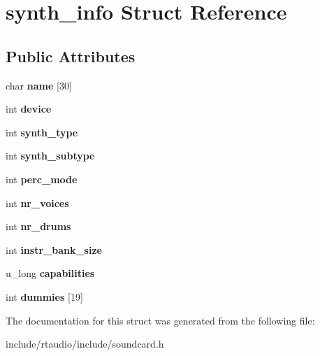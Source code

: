 \hypertarget{structsynth__info}{}\section{synth\+\_\+info Struct Reference}
\label{structsynth__info}
\subsection*{Public Attributes}
\begin{DoxyCompactItemize}
\item 
char {\bfseries name} \mbox{[}30\mbox{]}\hypertarget{structsynth__info_a39ea9232926050615deea90d1261eafb}{}\label{structsynth__info_a39ea9232926050615deea90d1261eafb}

\item 
int {\bfseries device}\hypertarget{structsynth__info_ad3cef2cac99f9234ed86ef7c159cf7b1}{}\label{structsynth__info_ad3cef2cac99f9234ed86ef7c159cf7b1}

\item 
int {\bfseries synth\+\_\+type}\hypertarget{structsynth__info_aab8a4f91e2b391aa530265dfe1cd9bd6}{}\label{structsynth__info_aab8a4f91e2b391aa530265dfe1cd9bd6}

\item 
int {\bfseries synth\+\_\+subtype}\hypertarget{structsynth__info_aa0452fb21cced9e9218d2a015ed1e556}{}\label{structsynth__info_aa0452fb21cced9e9218d2a015ed1e556}

\item 
int {\bfseries perc\+\_\+mode}\hypertarget{structsynth__info_ae24d12836748145fef1f52e832b338ce}{}\label{structsynth__info_ae24d12836748145fef1f52e832b338ce}

\item 
int {\bfseries nr\+\_\+voices}\hypertarget{structsynth__info_a0aee4d6a7231343d0b744a76d23e0eb7}{}\label{structsynth__info_a0aee4d6a7231343d0b744a76d23e0eb7}

\item 
int {\bfseries nr\+\_\+drums}\hypertarget{structsynth__info_a40907a0d95f12b3b66aae19108c36942}{}\label{structsynth__info_a40907a0d95f12b3b66aae19108c36942}

\item 
int {\bfseries instr\+\_\+bank\+\_\+size}\hypertarget{structsynth__info_a415fd8f0298e23d4b1ecdc25c4195eb5}{}\label{structsynth__info_a415fd8f0298e23d4b1ecdc25c4195eb5}

\item 
u\+\_\+long {\bfseries capabilities}\hypertarget{structsynth__info_a586312e93b4ab874d1e1fa78a818f876}{}\label{structsynth__info_a586312e93b4ab874d1e1fa78a818f876}

\item 
int {\bfseries dummies} \mbox{[}19\mbox{]}\hypertarget{structsynth__info_af72440b3e63d829eedf14f66424624ec}{}\label{structsynth__info_af72440b3e63d829eedf14f66424624ec}

\end{DoxyCompactItemize}


The documentation for this struct was generated from the following file\+:\begin{DoxyCompactItemize}
\item 
include/rtaudio/include/soundcard.\+h\end{DoxyCompactItemize}
